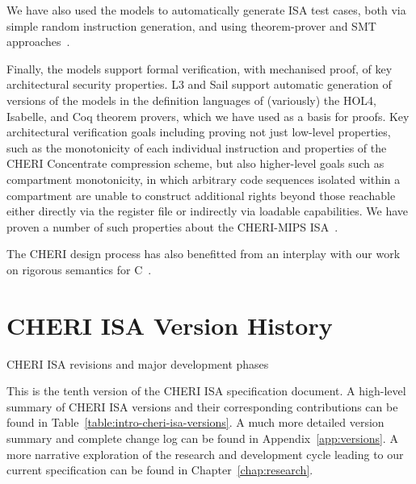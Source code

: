 We have also used the models to automatically generate ISA test cases,
both via simple random instruction generation, and using
theorem-prover and SMT approaches~\cite{DBLP:journals/scp/CampbellS16}.


Finally, the models support formal verification, with mechanised
proof, of key architectural security properties.
L3 and Sail support automatic generation of versions of the models in
the definition languages of (variously) the
HOL4, Isabelle, and Coq theorem provers, which we have used as a basis
for proofs.
Key architectural verification goals including proving not just low-level
properties, such as the monotonicity of each individual instruction
and properties of the CHERI Concentrate compression scheme, but also
higher-level goals such as compartment monotonicity, in which arbitrary code
sequences isolated within a compartment are unable to construct additional
rights beyond those reachable either directly via the register file or
indirectly via loadable capabilities.
We have proven a number of such properties about the CHERI-MIPS ISA~\cite{cheri-formal-SP2020,UCAM-CL-TR-940}.

The CHERI design process has also benefitted from an interplay with
our work on rigorous semantics for C~\cite{Cerberus-PLDI16,cerberus-popl2019}.


\section{CHERI ISA Version History}


\begin{table}[th!]
\begin{center}
\caption{CHERI ISA revisions and major development phases}

\end{center}
\label{table:intro-cheri-isa-versions}
\end{table}

This is the tenth version of the CHERI ISA specification document.
A high-level summary of CHERI ISA versions and their corresponding
contributions can be found in Table~\ref{table:intro-cheri-isa-versions}.
A much more detailed version summary and complete change log can be found in
Appendix~\ref{app:versions}.
A more narrative exploration of the research and development cycle leading to
our current specification can be found in Chapter~\ref{chap:research}.

